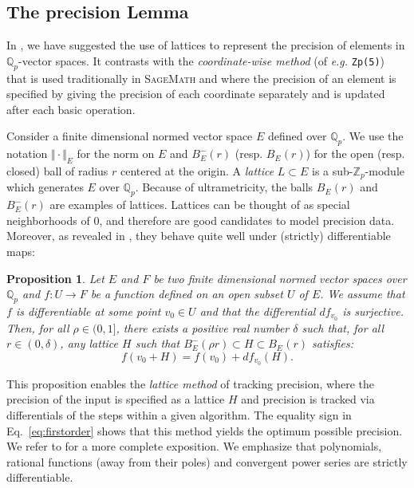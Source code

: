 \documentclass[sigconf]{acmart}
\newcommand{\Z}{\mathbb Z}
\newcommand{\Zp}{\Z_p}
\newcommand{\Q}{\mathbb Q}
\newcommand{\Qp}{\Q_p}
\newcommand{\sage}{\textsc{SageMath}\xspace}
\newtheorem{prop}[theo]{Proposition}
\theoremstyle{definition}
\begin{document}
\subsection{The precision Lemma}
\label{ssec:preclemma}

In \cite{caruso-roe-vaccon:14a}, we have suggested the 
use of lattices to represent the precision of elements in 
$\Qp$-vector spaces.  It contrasts with the
\emph{coordinate-wise method} (of \textit{e.g.}
 \verb?Zp(5)?) that is used traditionally in \sage and
where the precision of an element is specified by giving the precision
of each coordinate separately and is updated after each basic
operation.

Consider a finite dimensional normed vector space $E$ defined over 
$\Qp$. We use the notation $\Vert \cdot \Vert_E$ for the norm on $E$ and 
$B^-_E(r)$ (resp. $B^{\phantom -}_E(r)$) for the open (resp. closed) 
ball of radius $r$ centered at the origin. A \emph{lattice} $L \subset 
E$ is a sub-$\Zp$-module which generates $E$ over $\Qp$. Because of 
ultrametricity, the balls $B^{\phantom -}_E(r)$ and $B^-_E(r)$ are 
examples of lattices. Lattices can be thought of as special 
neighborhoods of $0$, and therefore are good candidates to model 
precision data. Moreover, as revealed in \cite{caruso-roe-vaccon:14a}, 
they behave quite well under (strictly) differentiable maps:

\begin{prop}
\label{prop:precision}
Let $E$ and $F$ be two finite dimensional normed vector spaces over $\Qp$ 
and $f : U \rightarrow F$ be a function defined on an open subset $U$ of 
$E$. We assume that $f$ is differentiable at some point $v_0 \in U$ and 
that the differential $df_{v_0}$ is surjective.
Then, for all $\rho \in (0, 1]$, there exists a positive real
number $\delta$ such that, for all $r \in (0, \delta)$, any lattice
$H$ such that $B^-_E(\rho r) \subset H \subset B^{\phantom -}_E(r)$ 
satisfies:
\begin{equation}
\label{eq:firstorder}
f(v_0 + H) = f(v_0) + df_{v_0} (H).
\end{equation}
\end{prop}

This proposition enables the \emph{lattice method} of tracking precision,
where the precision of the input is specified as a lattice $H$ and precision
is tracked via differentials of the steps within a given algorithm.
The equality sign in Eq.~\eqref{eq:firstorder} shows that this method
yields the optimum possible precision. 
We refer to \cite[\S 4.1]{caruso-roe-vaccon:14a} for a more complete 
exposition.
We emphasize that polynomials, rational functions (away from their poles)
and convergent power series are strictly differentiable.
\end{document}
